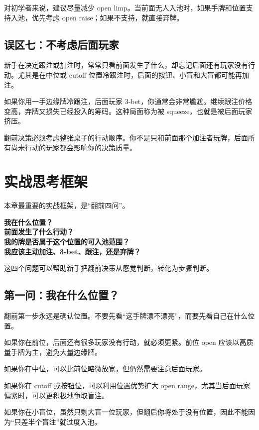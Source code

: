 对初学者来说，建议尽量减少 open limp。当前面无人入池时，如果手牌和位置支持入池，优先考虑 open raise；如果不支持，就直接弃牌。

\subsection{误区七：不考虑后面玩家}

新手在决定跟注或加注时，常常只看前面发生了什么，却忘记后面还有玩家没有行动。尤其是在中位或 cutoff 位置冷跟注时，后面的按钮、小盲和大盲都可能再加注。

如果你用一手边缘牌冷跟注，后面玩家 3-bet，你通常会非常尴尬。继续跟注价格变高，弃牌又损失已经投入的筹码。这种局面称为被 squeeze，也就是被后面玩家挤压。

翻前决策必须考虑整张桌子的行动顺序。你不是只和前面那个加注者玩牌，后面所有尚未行动的玩家都会影响你的决策质量。

\section{实战思考框架}

本章最重要的实战框架，是“翻前四问”。

\begin{center}
\textbf{我在什么位置？\\
前面发生了什么行动？\\
我的牌是否属于这个位置的可入池范围？\\
我应该主动加注、3-bet、跟注，还是弃牌？}
\end{center}

这四个问题可以帮助新手把翻前决策从感觉判断，转化为步骤判断。

\subsection{第一问：我在什么位置？}

翻前第一步永远是确认位置。不要先看“这手牌漂不漂亮”，而要先看自己在什么位置。

如果你在前位，后面还有很多玩家没有行动，就必须更紧。前位 open 应该以高质量手牌为主，避免大量边缘牌。

如果你在中位，可以比前位略微放宽，但仍然需要注意后面玩家。

如果你在 cutoff 或按钮位，可以利用位置优势扩大 open range，尤其当后面玩家偏紧时，可以更积极地争取盲注。

如果你在小盲位，虽然只剩大盲一位玩家，但翻后你将处于没有位置，因此不能因为“只差半个盲注”就过度入池。

